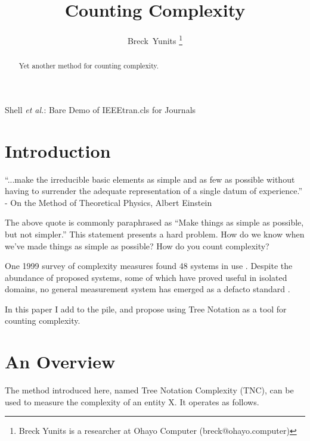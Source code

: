 \documentclass[journal]{IEEEtran}
\begin{document}
\title{Counting Complexity}

\author{Breck~Yunits%
\thanks{Breck Yunits is a researcher at Ohayo Computer (breck@ohayo.computer)}%
}

%
{Shell \MakeLowercase{\textit{et al.}}: Bare Demo of IEEEtran.cls for Journals}

\maketitle


\begin{abstract}
Yet another method for counting complexity.
\end{abstract}

\IEEEpeerreviewmaketitle

\section{Introduction}

\begin{displayquote}
``...make the irreducible basic elements as simple and as few as possible without having to surrender the adequate representation of a single datum of experience.''
- On the Method of Theoretical Physics, Albert Einstein

\end{displayquote}

The above quote is commonly paraphrased as ``Make things as simple as possible, but not simpler.'' This statement presents a hard problem. How do we know when we've made things as simple as possible? How do you count complexity?

One 1999 survey of complexity measures found 48 systems in use \cite{Edmonds}. Despite the abundance of proposed systems, some of which have proved useful in isolated domains, no general measurement system has emerged as a defacto standard \cite{Mitchell}.

In this paper I add to the pile, and propose using Tree Notation as a tool for counting complexity.

\section{An Overview}

The method introduced here, named Tree Notation Complexity (TNC), can be used to measure the complexity of an entity X. It operates as follows.
\end{document}
